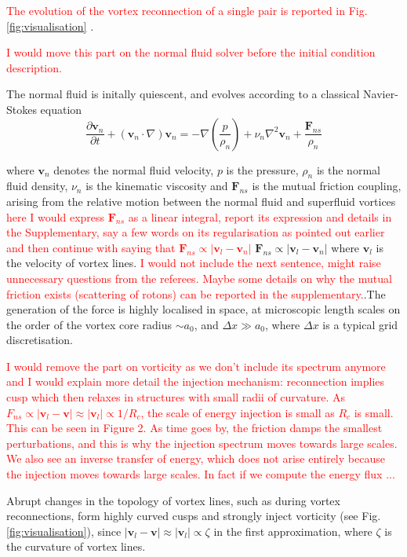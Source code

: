 \documentclass[%
 reprint,
 amsmath,amssymb,
 aps,
 prl,
]{revtex4-2}
\def \v{\mathbf{v}}
\def\red#1{\textcolor{red}{#1}}
\begin{document}
\red{The evolution of the vortex reconnection of a single pair is reported in Fig. \ref{fig:visualisation} }. 

\red{I would move this part on the normal fluid solver before the initial condition description.}

The normal fluid is initally quiescent, and evolves according to a classical Navier-Stokes equation
\begin{equation}
    \frac{\partial\v_n}{\partial t } + (\v_n\cdot\nabla)\v_n = -\nabla\left(\frac{p}{\rho_n}\right) + \nu_n\nabla^2\v_n + \frac{\mathbf{F}_{ns}}{\rho_n}
\end{equation}
 
where $\v_n$ denotes the normal fluid velocity, $p$ is the pressure, $\rho_n$ is the normal fluid density, $\nu_n$ is the kinematic viscosity and $\mathbf{F}_{ns}$ is the mutual friction coupling, arising from the relative motion between the normal fluid and superfluid vortices 
\red{here I would express $\mathbf{F}_{ns}$ as a linear integral, report its expression and details in the Supplementary, say a few words on its regularisation as pointed out earlier and then continue with saying that $\mathbf{F}_{ns}\propto \left|\v_{l}-\v_n\right|$ }
$\mathbf{F}_{ns}\propto \left|\v_{l}-\v_n\right|$ where $\v_l$ is the velocity of vortex lines. 
\red{I would not include the next sentence, might raise unnecessary questions from the referees. Maybe some details on why the mutual friction exists (scattering of rotons) can be reported in the supplementary.}.The generation of the force is highly localised in space, at microscopic length scales on the order of the vortex core radius $\sim a_0$, and $\Delta x \gg a_0$, where $\Delta x$ is a typical grid discretisation. 

\red{I would remove the part on vorticity as we don't include its spectrum anymore and I would explain more detail the injection mechanism:
reconnection implies cusp which then relaxes in structures with small radii of curvature. As $F_{ns}\propto|\v_l-\v|\approx|\v_l|\propto 1/R_c$, the scale of 
energy injection is small as $R_c$ is small. This can be seen in Figure 2. As time goes by, the friction damps the smallest perturbations, and this is why the injection spectrum moves towards large scales. We also see an inverse transfer of energy, which does not arise entirely because the injection moves towards large scales. In fact if we compute the energy flux ...}

Abrupt changes in the topology of vortex lines, such as during vortex reconnections, form highly curved cusps and strongly inject vorticity (see Fig. \ref{fig:visualisation}), since $|\v_l-\v|\approx|\v_l|\propto\zeta$ in the first approximation, where $\zeta$ is the curvature of vortex lines. 
\end{document}
